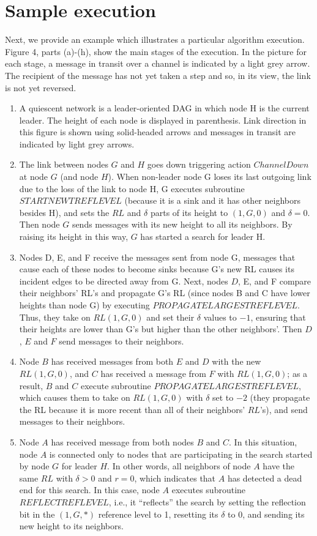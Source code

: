 \section{Sample execution}
Next, we provide an example which illustrates a particular algorithm execution. Figure 4, parts (a)-(h), show the main stages of the execution. In the picture for each stage, a message in transit over a channel is indicated by a light grey arrow. The recipient of the message has not yet taken a step and so, in its view, the link is not yet reversed.
\begin{enumerate}[label=\alph*)]
	\item A quiescent network is a leader-oriented DAG in which node H is the current leader. The height of each node is displayed in parenthesis. Link direction in this figure is shown using solid-headed arrows and messages in transit are indicated by light grey arrows.
	\item The link between nodes $G$ and $H$ goes down triggering action $ChannelDown$ at node $G$ (and node $H$). When non-leader node G loses its last outgoing link due to the loss of the link to node H, G executes subroutine $STARTNEWTREFLEVEL$ (because it is a sink and it has other neighbors besides H), and sets the $RL$ and $\delta$ parts of its height to $(1,G,0)$ and $\delta = 0$. Then node $G$ sends messages with its new height to all its neighbors. By raising its height in this way, $G$ has started a search for leader H.
	\item Nodes D, E, and F receive the messages sent from node G, messages that cause each of these nodes to become sinks because G’s new RL causes its incident edges to be directed away from G. Next, nodes $D$, E, and F compare their neighbors’ RL’s and propagate G’s RL (since nodes B and C have lower heights than node G) by executing $PROPAGATELARGESTREFLEVEL$. Thus, they take on $RL (1,G,0)$ and set their $\delta$ values to $-1$, ensuring that their heights are lower than G’s but higher than the other neighbors’. Then $D$, $E$ and $F$ send messages to their neighbors.
	\item Node $B$ has received messages from both $E$ and $D$ with the new $RL (1,G,0)$, and $C$ has received a message from $F$ with $RL (1,G,0)$; as a result, $B$ and $C$ execute subroutine $PROPAGATELARGESTREFLEVEL$, which causes them to take on $RL (1,G,0)$ with $\delta$ set to $-2$ (they propagate the RL because it is more recent than all of their neighbors’ $RL$’s), and send messages to their neighbors.
	\item Node $A$ has received message from both nodes $B$ and $C$. In this situation, node $A$ is connected only to nodes that are participating in the search started by node $G$ for leader $H$. In other words, all neighbors of node $A$ have the same $RL$ with $\delta > 0$ and $r = 0$, which indicates that $A$ has detected a dead end for this search. In this case, node $A$ executes subroutine $REFLECTREFLEVEL$, i.e., it “reflects” the search by setting the reflection bit in the $(1,G,*)$ reference level to 1, resetting its $\delta$ to 0, and sending its new height to its neighbors.

\end{enumerate}
